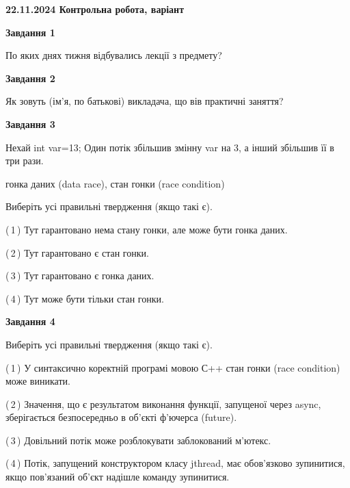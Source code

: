 \documentclass[12pt, ukrainian]{article}
\begin{document}
\begin {large}

\textbf{22.11.2024 Контрольна робота, варіант  }\par


{

\begin{center}
\textbf{Завдання 1}
\end{center}

По яких днях тижня відбувались лекції з предмету?


\begin{center}
\textbf{Завдання 2}
\end{center}

Як зовуть (ім'я, по батькові) викладача, що вів практичні заняття?


\begin{center}
\textbf{Завдання 3}
\end{center}

Нехай int var=13; Один потік збільшив змінну var на 3, а інший збільшив її в три рази.

гонка даних (data race), стан гонки (race condition)

Виберіть усі правильні твердження (якщо такі є).\par
\vspace{2mm}
(\,1\,) Тут гарантовано нема стану гонки, але може бути гонка даних.%

(\,2\,) Тут гарантовано є стан гонки.%

(\,3\,) Тут гарантовано є гонка даних.%

(\,4\,) Тут може бути тільки стан гонки.%


\begin{center}
\textbf{Завдання 4}
\end{center}

Виберіть усі правильні твердження (якщо такі є).\par
\vspace{2mm}

(\,1\,) У синтаксично коректній програмі мовою С++ стан гонки (race condition) може виникати.%

(\,2\,) Значення, що є результатом виконання функції, запущеної через async, зберігається безпосередньо в об’єкті ф’ючерса (future).%

(\,3\,) Довільний потік може розблокувати заблокований м’ютекс.%

(\,4\,) Потік, запущений конструктором класу jthread, має обов’язково зупинитися, якщо пов’язаний об’єкт надішле команду зупинитися.%


}
\end{large}
\end{document}

